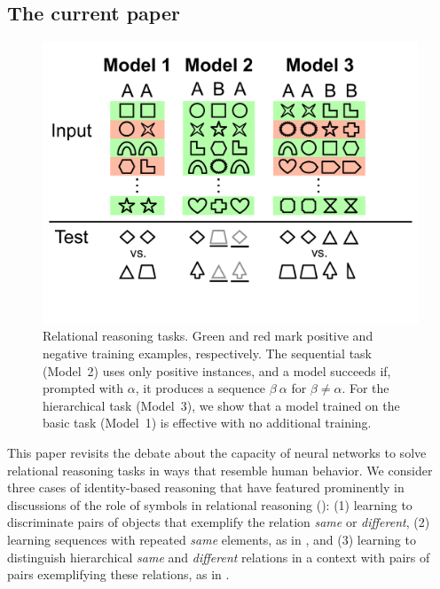 \documentclass[9pt,twocolumn,twoside,lineno]{pnas-new}
\begin{document}
\subsection{The current paper}

\begin{figure}[tp]
  \centering
  \includegraphics[scale=0.20]{modelfigv1.pdf}
  \caption{Relational reasoning tasks. Green and red mark positive and negative training examples, respectively. The sequential task (Model~2) uses only positive instances, and a model succeeds if, prompted with $\alpha$, it produces a sequence $\beta \ \alpha$ for $\beta \neq \alpha$. For the hierarchical task (Model~3), we show that a model trained on the basic task (Model~1) is effective with no additional training.}
  \label{fig:tasks}
\end{figure}

This paper revisits the debate about the capacity of neural networks to solve relational reasoning tasks in ways that resemble human behavior. We consider three cases of identity-based reasoning that have featured prominently in discussions of the role of symbols in relational reasoning (): (1) learning to discriminate pairs of objects that exemplify the relation \emph{same} or \emph{different}, (2) learning sequences with repeated \emph{same} elements, as in \citet{marcus:1999}, and (3) learning to distinguish hierarchical \emph{same} and \emph{different} relations in a context with pairs of pairs exemplifying these relations, as in \citet{Premack:1983}.
\end{document}
